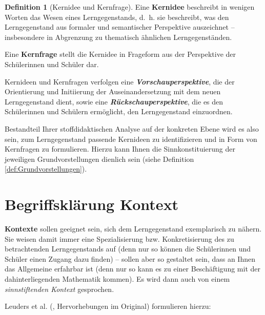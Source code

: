 \documentclass[
]{scrbook}
\theoremstyle{definition}
\newtheorem{definition}{Definition}[chapter]
\theoremstyle{definition}
\theoremstyle{definition}
\theoremstyle{definition}
\theoremstyle{remark}
\begin{document}
\begin{definition}[Kernidee und Kernfrage]
\protect\hypertarget{def:Kernidee}{}\label{def:Kernidee}Eine \textbf{Kernidee} beschreibt in wenigen Worten das Wesen eines Lerngegenstands, d.~h. sie beschreibt, was den Lerngegenstand aus formaler und semantischer Perspektive auszeichnet -- insbesondere in Abgrenzung zu thematisch ähnlichen Lerngegenständen.

Eine \textbf{Kernfrage} stellt die Kernidee in Frageform aus der Perspektive der Schülerinnen und Schüler dar.

Kernideen und Kernfragen verfolgen eine \textbf{\emph{Vorschauperspektive}}, die der Orientierung und Initiierung der Auseinandersetzung mit dem neuen Lerngegenstand dient, sowie eine \textbf{\emph{Rückschauperspektive}}, die es den Schülerinnen und Schülern ermöglicht, den Lerngegenstand einzuordnen.
\end{definition}

Bestandteil Ihrer stoffdidaktischen Analyse auf der \textcolor{concreteColor}{konkreten Ebene} wird es also sein, zum Lerngegenstand passende Kernideen zu identifizieren und in Form von Kernfragen zu formulieren. Hierzu kann Ihnen die Sinnkonstituierung der jeweiligen Grundvorstellungen dienlich sein (siehe Definition \ref{def:Grundvorstellungen}).

\section{Begriffsklärung Kontext}\label{kontexte-begriffsklaerung}

\textbf{Kontexte} sollen geeignet sein, sich dem Lerngegenstand exemplarisch zu nähern. Sie weisen damit immer eine Spezialisierung bzw. Konkretisierung des zu betrachtenden Lerngegenstands auf (denn nur so können die Schülerinnen und Schüler einen Zugang dazu finden) -- sollen aber so gestaltet sein, dass an Ihnen das Allgemeine erfahrbar ist (denn nur so kann es zu einer Beschäftigung mit der dahinterliegenden Mathematik kommen). Es wird dann auch von einem \emph{sinnstiftenden Kontext} gesprochen.

Leuders et al. (, Hervorhebungen im Original) formulieren hierzu:
\end{document}
